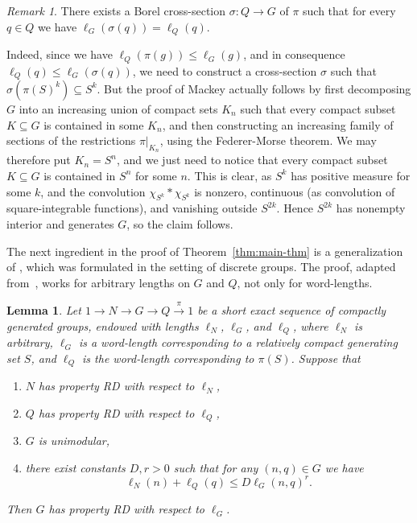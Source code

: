 \documentclass{amsart}
\newtheorem{lemma}[theorem]{Lemma}
\theoremstyle{definition}
\theoremstyle{remark}
\newtheorem{remark}[theorem]{Remark}
\begin{document}
\begin{remark}
  \label{thm:good-section}
  There exists a Borel cross-section $\sigma\colon Q\to G$ of $\pi$ such that
  for every $q\in Q$ we have $\ell_G(\sigma(q)) =\ell_Q(q)$.
\end{remark}

Indeed, since we have $\ell_Q(\pi(g)) \leq \ell_G(g)$, and in
consequence $\ell_Q(q)\leq\ell_G(\sigma(q))$, we need to construct a
cross-section $\sigma$ such that $\sigma(\pi(S)^k)\subseteq S^k$. But
the proof of Mackey actually follows by first decomposing $G$ into an
increasing union of compact sets $K_n$ such that every compact subset
$K\subseteq G$ is contained in some $K_n$, and then constructing an
increasing family of sections of the restrictions $\pi|_{K_n}$, using
the Federer-Morse theorem. We may therefore put
$K_n=S^n$, and we just need to notice that every compact subset
$K\subseteq G$ is contained in $S^n$ for some $n$. This is clear, as
$S^k$ has positive measure for some $k$, and the convolution
$\chi_{S^k}*\chi_{S^k}$ is nonzero, continuous (as convolution of
square-integrable functions), and vanishing outside $S^{2k}$. Hence
$S^{2k}$ has nonempty interior and generates $G$, so the claim follows.

The next ingredient in the proof of Theorem~\ref{thm:main-thm} is a
generalization of \cite[Lemma 2.1.2]{Jolissaint1990}, which was
formulated in the setting of discrete groups. The proof, adapted
from~\cite{Jolissaint1990}, works for arbitrary lengths on $G$ and
$Q$, not only for word-lengths.

\begin{lemma}
  \label{thm:length-on-extension} Let $1\to N\to G\to
  Q\overset{\pi}{\to} 1$ be a short exact sequence of compactly
  generated groups, endowed with lengths $\ell_N$, $\ell_G$, and
  $\ell_Q$, where $\ell_N$ is arbitrary, $\ell_G$ is a word-length
  corresponding to a relatively compact generating set $S$, and
  $\ell_Q$ is the word-length corresponding to $\pi(S)$. Suppose that
  \begin{enumerate}
  \item $N$ has property RD with respect to $\ell_N$,
  \item $Q$ has property RD with respect to $\ell_Q$,
  \item $G$ is unimodular,
  \item there exist constants $D,r>0$ such that for any $(n,q)\in G$
    we have
    \begin{equation}
      \ell_N(n)+ \ell_Q(q) \leq D\ell_G(n,q)^r.
    \end{equation}
  \end{enumerate}
  Then $G$ has property RD with respect to $\ell_G$.
\end{lemma}
\end{document}
